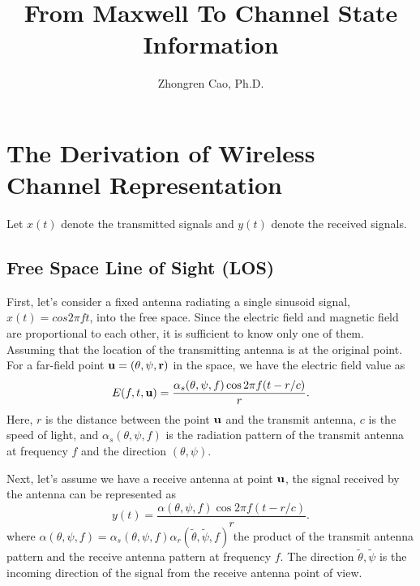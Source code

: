 \documentclass[letterpaper,11pt]{article}
\title{\bf{From Maxwell To Channel State Information}}
\author{Zhongren Cao, Ph.D.}
\begin{document}
\thispagestyle{fancy}

\maketitle

\section{The Derivation of Wireless Channel Representation}

Let $x(t)$ denote the transmitted signals and $y(t)$ denote the received signals. 

\subsection{Free Space Line of Sight (LOS)}

First, let's consider a fixed antenna radiating a single sinusoid signal, $x(t)=cos2\pi ft$, into the free space. Since the electric field and magnetic field are proportional to each other, it is sufficient to know only one of them. Assuming that the location of the transmitting antenna is at the original point. For a far-field point $\bf{u}=(\theta, \psi, r)$ in the space, we have the electric field value as
\begin{equation}
E(f,t,{\bf{u}})=\frac{\alpha_s(\theta, \psi, f)\cos2\pi f(t-r/c)}{r}.
\end{equation}
Here, $r$ is the distance between the point $\bf{u}$ and the transmit antenna, $c$ is the speed of light, and $\alpha_s(\theta, \psi, f)$ is the radiation pattern of the transmit antenna at frequency $f$ and the direction $(\theta, \psi)$.

Next, let's assume we have a receive antenna at point $\bf{u}$, the signal received by the antenna can be represented as
\begin{equation}\label{rxsignal}
y(t)=\frac{\alpha(\theta,\psi,f)\cos2\pi f(t-r/c)}{r}.
\end{equation}
where $\alpha(\theta,\psi,f)=\alpha_s(\theta, \psi, f)\alpha_r(\tilde{\theta}, \tilde{\psi}, f)$ the product of the transmit antenna pattern and the receive antenna pattern at frequency $f$. The direction $\tilde{\theta}, \tilde{\psi}$ is the incoming direction of the signal from the receive antenna point of view. \\

\end{document}
